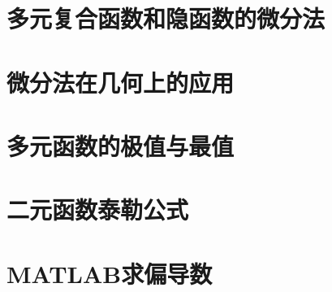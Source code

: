 \section{多元复合函数和隐函数的微分法}

\section{微分法在几何上的应用}

\section{多元函数的极值与最值}

\section{二元函数泰勒公式}

\section{MATLAB求偏导数}